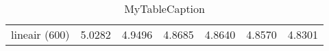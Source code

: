 \begin{table}
\centering
\begin{tabular}{|c|c|c|c|c|c|c|}
\hline
 &  &  &  &  &  &  \\
\hline
lineair (600) & 5.0282 & 4.9496 & 4.8685 & 4.8640 & 4.8570 & 4.8301 \\
\hline
\end{tabular}
\caption{MyTableCaption}
\label{table:MyTableLabel}
\end{table}

